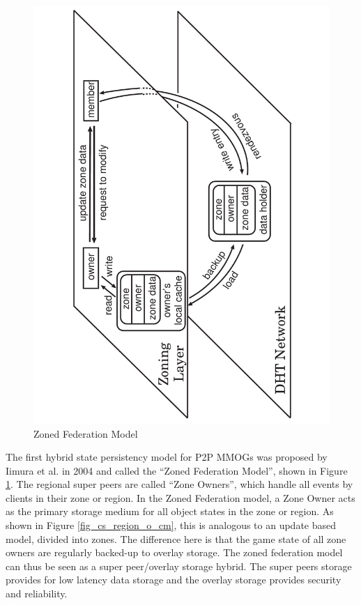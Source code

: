 \documentclass[10pt,a4paper,journal,cspaper,compsoc]{IEEEtran}
\begin{document}
\begin{figure}[htbp]
 \centering
 \includegraphics[clip=true, viewport=2cm 0cm 19cm 30cm, angle=-90, width=\columnwidth]{zoned_federation_model}
 \caption{Zoned Federation Model \cite{zoned_federation}}
 \label{fig_zoned_federation_model}
\end{figure}
%
The first hybrid state persistency model for P2P MMOGs was proposed by Iimura et al. in 2004 \cite{zoned_federation} and called the ``Zoned
Federation Model'', shown in Figure \ref{fig_zoned_federation_model}. The regional super peers are called ``Zone Owners'', which handle all events by
clients in their zone or region. In the Zoned Federation model, a Zone Owner acts as the primary storage medium for all object states in the zone or
region. As shown in Figure \ref{fig_cs_region_o_cm}, this is analogous to an update based model, divided into zones. The difference here is that the
game state of all zone owners are regularly backed-up to overlay storage. The zoned federation model can thus be seen as a super peer/overlay storage
hybrid. The super peers storage provides for low latency data storage and the overlay storage provides security and reliability.
\end{document}
